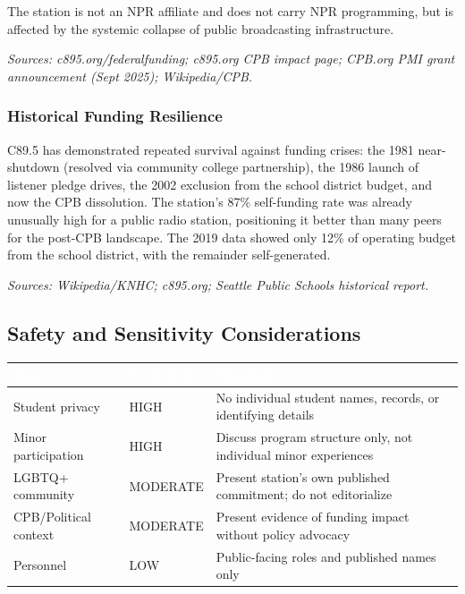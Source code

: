 \documentclass[11pt,letterpaper]{article}
\newcommand{\tableheader}[1]{\textbf{\sffamily\textcolor{white}{#1}}}
\begin{document}
The station is not an NPR affiliate and does not carry NPR programming, but is affected by the systemic collapse of public broadcasting infrastructure.

\textit{Sources: c895.org/federalfunding; c895.org CPB impact page; CPB.org PMI grant announcement (Sept 2025); Wikipedia/CPB.}

\subsubsection{Historical Funding Resilience}

C89.5 has demonstrated repeated survival against funding crises: the 1981 near-shutdown (resolved via community college partnership), the 1986 launch of listener pledge drives, the 2002 exclusion from the school district budget, and now the CPB dissolution. The station's 87\% self-funding rate was already unusually high for a public radio station, positioning it better than many peers for the post-CPB landscape. The 2019 data showed only 12\% of operating budget from the school district, with the remainder self-generated.

\textit{Sources: Wikipedia/KNHC; c895.org; Seattle Public Schools historical report.}

\subsection{Safety and Sensitivity Considerations}

\begin{center}
\begin{tabularx}{\textwidth}{L{3.5cm}C{2cm}X}
\toprule
{}
\tableheader{Topic} & \tableheader{Sensitivity} & \tableheader{Handling} \\
\midrule
Student privacy & HIGH & No individual student names, records, or identifying details \\
Minor participation & HIGH & Discuss program structure only, not individual minor experiences \\
LGBTQ+ community & MODERATE & Present station's own published commitment; do not editorialize \\
CPB/Political context & MODERATE & Present evidence of funding impact without policy advocacy \\
Personnel & LOW & Public-facing roles and published names only \\
\bottomrule
\end{tabularx}
\end{center}
\end{document}
